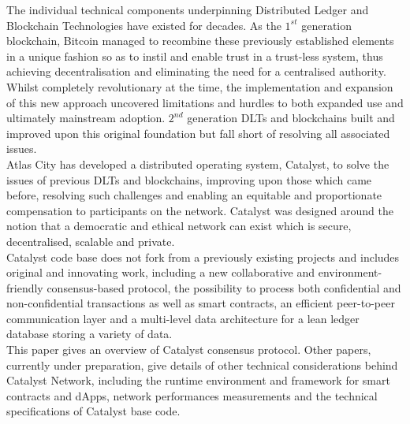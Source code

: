 The individual technical components underpinning Distributed Ledger and Blockchain Technologies have existed for decades. As the $1^{st}$ generation blockchain, Bitcoin managed to recombine these previously established elements in a unique fashion so as to instil and enable trust in a trust-less system, thus achieving decentralisation and eliminating the need for a centralised authority. Whilst completely revolutionary at the time, the implementation and expansion of this new approach uncovered limitations and hurdles to both expanded use and ultimately mainstream adoption. $2^{nd}$ generation DLTs and blockchains built and improved upon this original foundation but fall short of resolving all associated issues. \\
 
Atlas City has developed a distributed operating system, Catalyst, to solve the issues of previous DLTs and blockchains, improving upon those which came before, resolving such challenges and enabling an equitable and proportionate compensation to participants on the network. Catalyst was designed around the notion that a democratic and ethical network can exist which is secure, decentralised, scalable and private.  \\
 
Catalyst code base does not fork from a previously existing projects and includes original and innovating work, including a new collaborative and environment-friendly consensus-based protocol, the possibility to process both confidential and non-confidential transactions as well as smart contracts, an efficient peer-to-peer communication layer and a multi-level data architecture for a lean ledger database storing a variety of data.\\
 
This paper gives an overview of Catalyst consensus protocol. Other papers, currently under preparation, give details of other technical considerations behind Catalyst Network, including the runtime environment and framework for smart contracts and dApps, network performances measurements and the technical specifications of Catalyst base code. 

